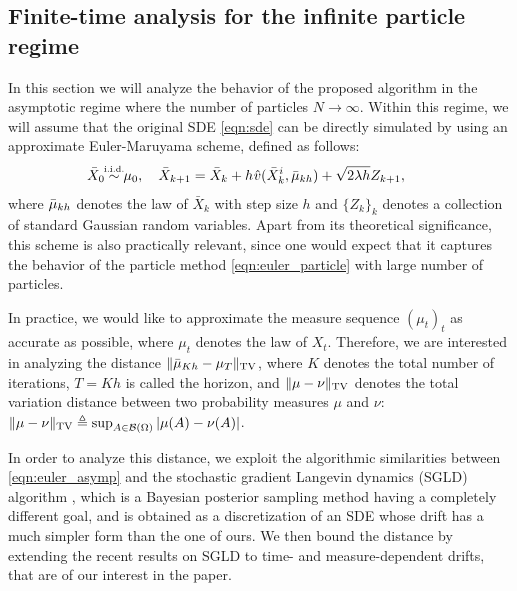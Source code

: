 
\subsection{Finite-time analysis for the infinite particle regime}
%
In this section we will analyze the behavior of the proposed algorithm in the asymptotic regime where the number of particles $N \rightarrow \infty$. Within this regime, we will assume that the original SDE \eqref{eqn:sde} can be directly simulated by using an approximate Euler-Maruyama scheme, defined as follows:
\begin{align}
\bar{X}_0 \simiid \mu_0, \quad \bar{X}_{k+1} = \bar{X}_k + h \hspace{0.5pt} \hat{v}(\bar{X}^i_k, \bar{\mu}_{kh} ) + \sqrt{2 \lambda h} Z_{k+1}, \qquad \label{eqn:euler_asymp}
\end{align}
where $\bar{\mu}_{kh}$ denotes the law of $\bar{X}_k$ with step size $h$ and $\{Z_k\}_{k}$ denotes a collection of standard Gaussian random variables. Apart from its theoretical significance, this scheme is also practically relevant, since one would expect that it captures the behavior of the particle method \eqref{eqn:euler_particle} with large number of particles. 

In practice, we would like to approximate the measure sequence $(\mu_t)_t$ as accurate as possible, where $\mu_t$ denotes the law of $X_t$. Therefore, we are interested in analyzing the distance $\| \bar{\mu}_{Kh} - \mu_{T} \|_{\textnormal{TV}}$, where $K$ denotes the total number of iterations, $T=Kh$ is called the horizon, and $\|\mu-\nu\|_{\textnormal{TV}}$ denotes the total variation distance between two probability measures $\mu$ and $\nu$: $\|\mu-\nu\|_{\textnormal{TV}}\triangleq \sup_{A \in {\cal B}(\Omega)} |\mu(A) -\nu(A) |$. 
%

In order to analyze this distance, we exploit the algorithmic similarities between \eqref{eqn:euler_asymp} and the stochastic gradient Langevin dynamics (SGLD) algorithm \cite{WelTeh2011a}, which is a Bayesian posterior sampling method having a completely different goal, and is obtained as a discretization of an SDE whose drift has a much simpler form than the one of ours. We then bound the distance by extending the recent results on SGLD \cite{raginsky17a} to time- and measure-dependent drifts, that are of our interest in the paper.


